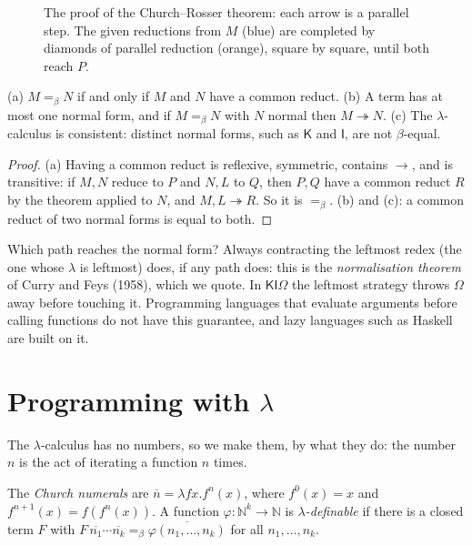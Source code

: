 \begin{figure}[ht]
\centering
{}
\caption{The proof of the Church--Rosser theorem: each arrow is a parallel step. The given reductions from $M$ (blue) are completed by diamonds of parallel reduction (orange), square by square, until both reach $P$.}
\label{fig:diamonds}
\end{figure}

\begin{corollary}\label{cor:nf}
\textup{(a)} $M=_\beta N$ if and only if $M$ and $N$ have a common reduct. \textup{(b)} A term has at most one normal form, and if $M=_\beta N$ with $N$ normal then $M\twoheadrightarrow N$. \textup{(c)} The $\lambda$-calculus is consistent: distinct normal forms, such as $\mathsf K$ and $\mathsf I$, are not $\beta$-equal.
\end{corollary}

\begin{proof}
(a) Having a common reduct is reflexive, symmetric, contains $\to$, and is transitive: if $M,N$ reduce to $P$ and $N,L$ to $Q$, then $P,Q$ have a common reduct $R$ by the theorem applied to $N$, and $M,L\twoheadrightarrow R$. So it is $=_\beta$. (b) and (c): a common reduct of two normal forms is equal to both.
\end{proof}

Which path reaches the normal form? Always contracting the leftmost redex (the one whose $\lambda$ is leftmost) does, if any path does: this is the \emph{normalisation theorem} of Curry and Feys (1958), which we quote. In $\mathsf K\mathsf I\Omega$ the leftmost strategy throws $\Omega$ away before touching it. Programming languages that evaluate arguments before calling functions do not have this guarantee, and lazy languages such as Haskell are built on it.

\section{Programming with \texorpdfstring{$\lambda$}{lambda}}\label{sec:church}

The $\lambda$-calculus has no numbers, so we make them, by what they do: the number $n$ is the act of iterating a function $n$ times.

\begin{definition}\label{def:numerals}
The \emph{Church numerals} are $\overline n=\lambda fx.f^n(x)$, where $f^0(x)=x$ and $f^{n+1}(x)=f(f^n(x))$. A function $\varphi:\mathbb N^k\to\mathbb N$ is \emph{$\lambda$-definable} if there is a closed term $F$ with $F\,\overline{n_1}\cdots\overline{n_k}=_\beta\overline{\varphi(n_1,\dots,n_k)}$ for all $n_1,\dots,n_k$.
\end{definition}

